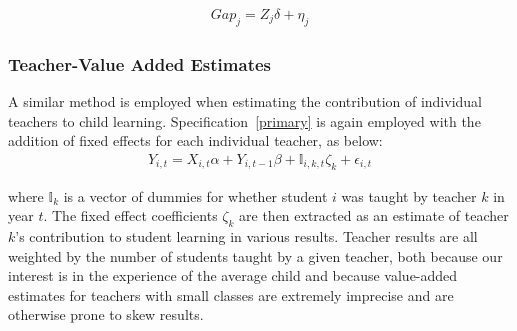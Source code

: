 \documentclass[Eubank_pk_ethnic_sorting.tex]{subfiles}
\begin{document}
\begin{eqnarray*}
	Gap_{j}=Z_{j}\delta+\eta_{j}\label{villagespecification}
\end{eqnarray*}

\subsubsection{Teacher-Value Added Estimates}\label{}
A similar method is employed when estimating the contribution of individual teachers to child learning. Specification~\ref{primary} is again employed with the addition of fixed effects for each individual teacher, as below:
\begin{eqnarray*}
	Y_{i,t}=X_{i,t}\alpha+Y_{i,t-1}\beta + \mathbb{I}_{i,k,t}\zeta_{k}+\epsilon_{i,t}\label{teacherspecification}
\end{eqnarray*}

where $\mathbb{I}_{k}$ is a vector of dummies for whether student $i$ was taught by teacher $k$ in year $t$. The fixed effect coefficients $\zeta_{k}$ are then extracted as an estimate of teacher $k$'s contribution to student learning in various results. Teacher results are all weighted by the number of students taught by a given teacher, both because our interest is in the experience of the average child and because value-added estimates for teachers with small classes are extremely imprecise and are otherwise prone to skew results. 

\end{document}
